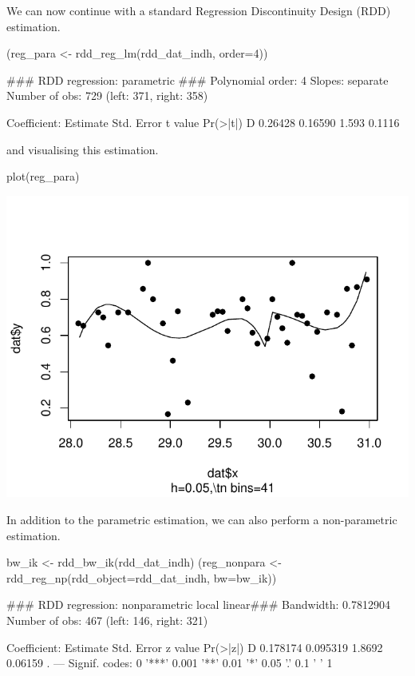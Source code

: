 \documentclass[article]{jss}
\begin{document}
We can now continue with a standard Regression Discontinuity Design
(RDD) estimation.

\begin{CodeChunk}
\begin{CodeInput}
(reg_para <- rdd_reg_lm(rdd_dat_indh, order=4))
\end{CodeInput}
\begin{CodeOutput}
### RDD regression: parametric ###
    Polynomial order:  4 
    Slopes:  separate 
    Number of obs: 729 (left: 371, right: 358)

    Coefficient:
  Estimate Std. Error t value Pr(>|t|)
D  0.26428    0.16590   1.593   0.1116
\end{CodeOutput}
\end{CodeChunk}

and visualising this estimation.

\begin{CodeChunk}
\begin{CodeInput}
plot(reg_para)
\end{CodeInput}


\begin{center}\includegraphics{README_files/figure-latex/unnamed-chunk-9-1} \end{center}

\end{CodeChunk}

In addition to the parametric estimation, we can also perform a
non-parametric estimation.

\begin{CodeChunk}
\begin{CodeInput}
bw_ik <- rdd_bw_ik(rdd_dat_indh)
(reg_nonpara <- rdd_reg_np(rdd_object=rdd_dat_indh, bw=bw_ik))
\end{CodeInput}
\begin{CodeOutput}
### RDD regression: nonparametric local linear###
    Bandwidth:  0.7812904 
    Number of obs: 467 (left: 146, right: 321)

    Coefficient:
  Estimate Std. Error z value Pr(>|z|)  
D 0.178174   0.095319  1.8692  0.06159 .
---
Signif. codes:  0 '***' 0.001 '**' 0.01 '*' 0.05 '.' 0.1 ' ' 1
\end{CodeOutput}
\end{CodeChunk}
\end{document}
